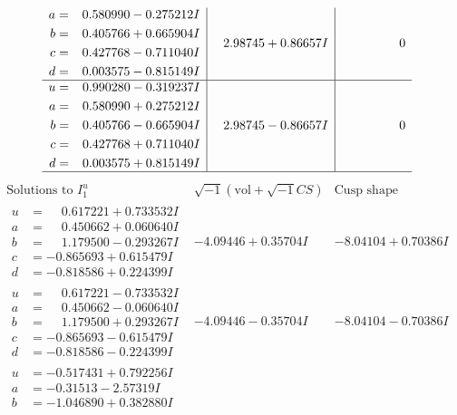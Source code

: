 \documentclass[1p]{elsarticle_modified}
\theoremstyle{definition}
\newcommand{\I}{\sqrt{-1}}
\begin{document}
$$\begin{array}{c|c|c}
\begin{aligned}
a &= \phantom{-}0.580990 - 0.275212 I \\
b &= \phantom{-}0.405766 + 0.665904 I \\
c &= \phantom{-}0.427768 - 0.711040 I \\
d &= \phantom{-}0.003575 - 0.815149 I\end{aligned}
 & \phantom{-}2.98745 + 0.86657 I & \phantom{-0.000000 } 0 \\ \hline\begin{aligned}
u &= \phantom{-}0.990280 - 0.319237 I \\
a &= \phantom{-}0.580990 + 0.275212 I \\
b &= \phantom{-}0.405766 - 0.665904 I \\
c &= \phantom{-}0.427768 + 0.711040 I \\
d &= \phantom{-}0.003575 + 0.815149 I\end{aligned}
 & \phantom{-}2.98745 - 0.86657 I & \phantom{-0.000000 } 0\\
 \hline 
 \end{array}$$\newpage$$\begin{array}{c|c|c}  
\text{Solutions to }I^u_{1}& \I (\text{vol} + \sqrt{-1}CS) & \text{Cusp shape}\\
 \hline 
\begin{aligned}
u &= \phantom{-}0.617221 + 0.733532 I \\
a &= \phantom{-}0.450662 + 0.060640 I \\
b &= \phantom{-}1.179500 - 0.293267 I \\
c &= -0.865693 + 0.615479 I \\
d &= -0.818586 + 0.224399 I\end{aligned}
 & -4.09446 + 0.35704 I & -8.04104 + 0.70386 I \\ \hline\begin{aligned}
u &= \phantom{-}0.617221 - 0.733532 I \\
a &= \phantom{-}0.450662 - 0.060640 I \\
b &= \phantom{-}1.179500 + 0.293267 I \\
c &= -0.865693 - 0.615479 I \\
d &= -0.818586 - 0.224399 I\end{aligned}
 & -4.09446 - 0.35704 I & -8.04104 - 0.70386 I \\ \hline\begin{aligned}
u &= -0.517431 + 0.792256 I \\
a &= -0.31513 - 2.57319 I \\
b &= -1.046890 + 0.382880 I \\

\end{aligned}
\end{array}$$
\end{document}
